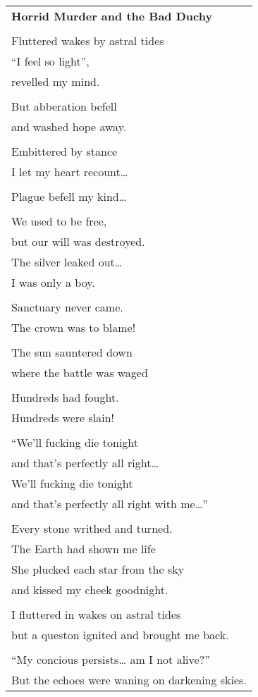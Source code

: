 \documentclass{article}
\begin{document}
\begin{center}
\begin{tabular}{l}
\textbf{Horrid Murder and the Bad Duchy} \\
\\
Fluttered wakes by astral tides \\
``I feel so light'', \\
revelled my mind. \\
\\
But abberation befell \\
and washed hope away. \\
\\
Embittered by stance \\
I let my heart recount\ldots{} \\
\\
Plague befell my kind\ldots{} \\
\\
We used to be free, \\
but our will was destroyed. \\
The silver leaked out\ldots{} \\
I was only a boy. \\
\\
Sanctuary never came. \\
The crown was to blame! \\
\\
The sun sauntered down \\
where the battle was waged \\
\\
Hundreds had fought. \\
Hundreds were slain! \\
\\
``We'll fucking die tonight \\ %
and that's perfectly all right\ldots{} \\
We'll fucking die tonight \\
and that's perfectly all right with me\ldots{}'' \\
\\
Every stone writhed and turned. \\
The Earth had shown me life \\
She plucked each star from the sky \\
and kissed my cheek goodnight. \\
\\
I fluttered in wakes on astral tides \\
but a queston ignited and brought me back. \\
\\
``My concious persists\ldots{} am I not alive?'' \\
But the echoes were waning on darkening skies. \\
\end{tabular}
\end{center}
\end{document}
